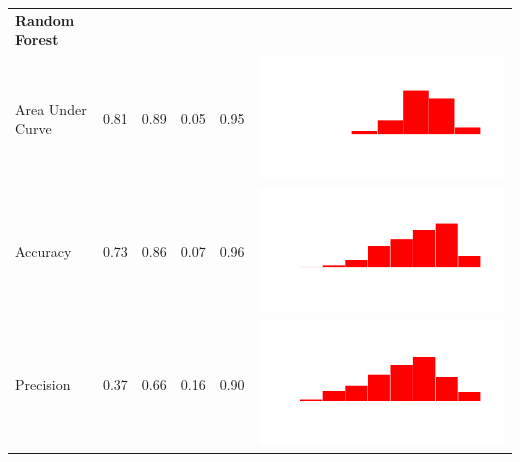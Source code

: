 \documentclass[conference]{IEEEtran}
\begin{document}
\begin{table}
\begin{tabular}{lrrrrc}
    \bf{Random Forest}\\
    Area Under Curve & 0.81 & 0.89 & 0.05 & 0.95 & \includegraphics[scale = 0.1, clip = true, trim= 50px 60px 50px 60px]{../figs/hist-results/hist-RFauc.pdf} \\
    Accuracy & 0.73 & 0.86 & 0.07 & 0.96 & \includegraphics[scale = 0.1, clip = true, trim= 50px 60px 50px 60px]{../figs/hist-results/hist-RFacc.pdf} \\
    Precision & 0.37 & 0.66 & 0.16 & 0.90 & \includegraphics[scale = 0.1, clip = true, trim= 50px 60px 50px 60px]{../figs/hist-results/hist-RFprec.pdf} \\

\end{tabular}
\end{table}
\end{document}
